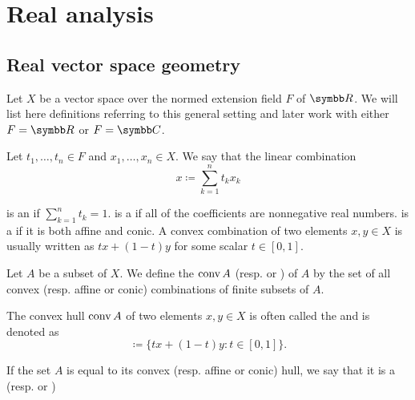 \section{Real analysis}\label{sec:real_analysis}
\subsection{Real vector space geometry}\label{subsec:real_vector_space_geometry}

\begin{remark}\label{remark:geometry_of_vector_spaces}
  Let \( X \) be a vector space over the normed extension field \( F \) of \( \R \). We will list here definitions referring to this general setting and later work with either \( F = \R \) or \( F = \BB{C} \).
\end{remark}

\begin{definition}\label{def:special_linear_combinations}
  Let \( t_1, \ldots, t_n \in F \) and \( x_1, \ldots, x_n \in X \). We say that the linear combination
  \begin{equation*}
    x \coloneqq \sum_{k=1}^n t_k x_k
  \end{equation*}

  \begin{defenum}
     is an  if \( \sum_{k=1}^n t_k = 1 \).
     is a  if all of the coefficients are nonnegative real numbers.
     is a  if it is both affine and conic. A convex combination of two elements \( x, y \in X \) is usually written as \( tx + (1-t)y \) for some scalar \( t \in [0, 1] \).
  \end{defenum}
\end{definition}

\begin{definition}\label{def:linear_combination_hulls}
  Let \( A \) be a subset of \( X \). We define the  \( \operatorname{conv} A \) (resp.  or ) of \( A \) by the set of all convex (resp. affine or conic) combinations of finite subsets of \( A \).

  The convex hull \( \operatorname{conv} A \) of two elements \( x, y \in X \) is often called the  and is denoted as
  \begin{equation*}
    [x, y] \coloneqq \{ tx + (1-t)y \colon t \in [0, 1] \}.
  \end{equation*}

  If the set \( A \) is equal to its convex (resp. affine or conic) hull, we say that it is a  (resp.  or )
\end{definition}

